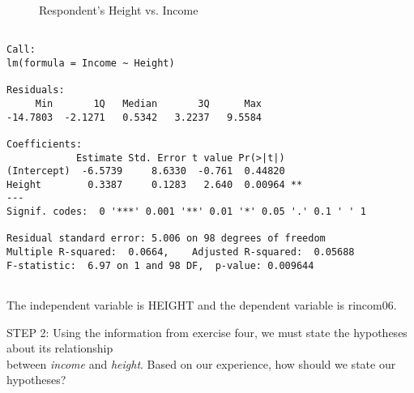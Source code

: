 \documentclass[11pt]{book}\usepackage[]{graphicx}\usepackage[]{color}
\begin{document}
\begin{exercises}
\begin{exercise}
\begin{figure}[ht]
{}

\caption[Respondent's Height vs]{Respondent's Height vs. Income}\label{fig:LBL16h}
\end{figure}



{\tiny{
  \begin{verbatim}

Call:
lm(formula = Income ~ Height)

Residuals:
     Min       1Q   Median       3Q      Max 
-14.7803  -2.1271   0.5342   3.2237   9.5584 

Coefficients:
            Estimate Std. Error t value Pr(>|t|)   
(Intercept)  -6.5739     8.6330  -0.761  0.44820   
Height        0.3387     0.1283   2.640  0.00964 **
---
Signif. codes:  0 '***' 0.001 '**' 0.01 '*' 0.05 '.' 0.1 ' ' 1

Residual standard error: 5.006 on 98 degrees of freedom
Multiple R-squared:  0.0664,	Adjusted R-squared:  0.05688 
F-statistic:  6.97 on 1 and 98 DF,  p-value: 0.009644


  \end{verbatim}
}}

    \vspace{5mm}

    \end{exercise}
    \begin{solution}    %

       The independent variable is HEIGHT and the dependent variable is rincom06.

    \end{solution}

  \begin{exercise} %

    STEP 2: Using the information from exercise four, we must state the hypotheses about its relationship \\ between {\textit{income}} and {\textit{height}}.  Based on our experience, how should we state our hypotheses?

    \vspace{5mm}

    \end{exercise}

  \begin{exercise} %


\end{exercise}
\end{exercises}
\end{document}
